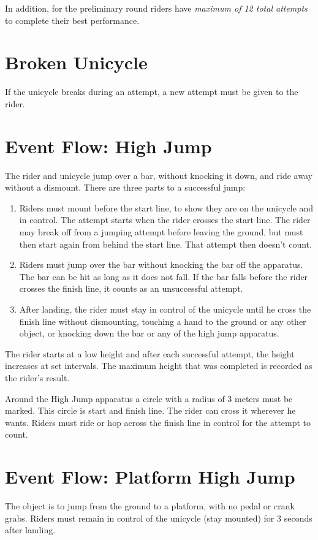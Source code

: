 In addition, for the preliminary round riders have \textit{maximum of 12 total attempts} to complete their best performance.

\section{Broken Unicycle}
If the unicycle breaks during an attempt, a new attempt must be given to the rider.

\section{Event Flow: High Jump}
The rider and unicycle jump over a bar, without knocking it down, and ride away without a dismount.
There are three parts to a successful jump:
\begin{enumerate}
\item Riders must mount before the start line, to show they are on the unicycle and in control.
The attempt starts when the rider crosses the start line.
The rider may break off from a jumping attempt before leaving the ground, but must then start again from behind the start line.
That attempt then doesn't count.
\item Riders must jump over the bar without knocking the bar off the apparatus.
The bar can be hit as long as it does not fall.
If the bar falls before the rider crosses the finish line, it counts as an unsuccessful attempt.
\item After landing, the rider must stay in control of the unicycle until he cross the finish line without dismounting, touching a hand to the ground or any other object, or knocking down the bar or any of the high jump apparatus.
\end{enumerate}
The rider starts at a low height and after each successful attempt, the height increases at set intervals.
The maximum height that was completed is recorded as the rider's result.

Around the High Jump apparatus a circle with a radius of 3 meters must be marked.
This circle is start and finish line.
The rider can cross it wherever he wants.
Riders must ride or hop across the finish line in control for the attempt to count.

\section{Event Flow: Platform High Jump}
The object is to jump from the ground to a platform, with no pedal or crank grabs.
Riders must remain in control of the unicycle (stay mounted) for 3 seconds after landing.

